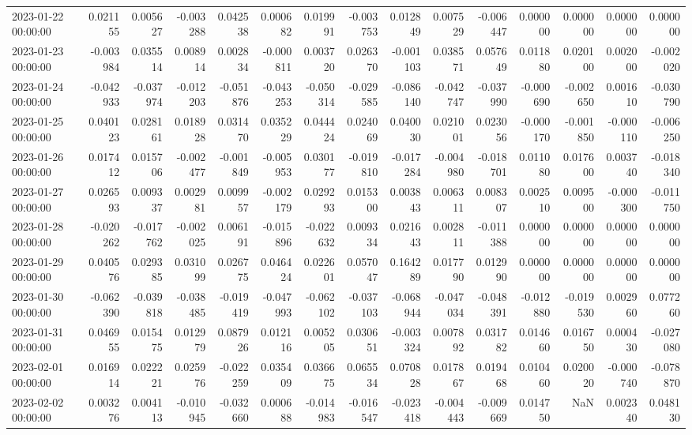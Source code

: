 \begin{tabular}{lrrrrrrrrrrrrrr}
2023-01-22 00:00:00 & 0.021155 & 0.005627 & -0.003288 & 0.042538 & 0.000682 & 0.019991 & -0.003753 & 0.012849 & 0.007529 & -0.006447 & 0.000000 & 0.000000 & 0.000000 & 0.000000 \\
2023-01-23 00:00:00 & -0.003984 & 0.035514 & 0.008914 & 0.002834 & -0.000811 & 0.003720 & 0.026370 & -0.001103 & 0.038571 & 0.057649 & 0.011880 & 0.020100 & 0.002000 & -0.002020 \\
2023-01-24 00:00:00 & -0.042933 & -0.037974 & -0.012203 & -0.051876 & -0.043253 & -0.050314 & -0.029585 & -0.086140 & -0.042747 & -0.037990 & -0.000690 & -0.002650 & 0.001610 & -0.030790 \\
2023-01-25 00:00:00 & 0.040123 & 0.028161 & 0.018928 & 0.031470 & 0.035229 & 0.044424 & 0.024069 & 0.040030 & 0.021001 & 0.023056 & -0.000170 & -0.001850 & -0.000110 & -0.006250 \\
2023-01-26 00:00:00 & 0.017412 & 0.015706 & -0.002477 & -0.001849 & -0.005953 & 0.030177 & -0.019810 & -0.017284 & -0.004980 & -0.018701 & 0.011080 & 0.017600 & 0.003740 & -0.018340 \\
2023-01-27 00:00:00 & 0.026593 & 0.009337 & 0.002981 & 0.009957 & -0.002179 & 0.029293 & 0.015300 & 0.003843 & 0.006311 & 0.008307 & 0.002510 & 0.009500 & -0.000300 & -0.011750 \\
2023-01-28 00:00:00 & -0.020262 & -0.017762 & -0.002025 & 0.006191 & -0.015896 & -0.022632 & 0.009334 & 0.021643 & 0.002811 & -0.011388 & 0.000000 & 0.000000 & 0.000000 & 0.000000 \\
2023-01-29 00:00:00 & 0.040576 & 0.029385 & 0.031099 & 0.026775 & 0.046424 & 0.022601 & 0.057047 & 0.164289 & 0.017790 & 0.012990 & 0.000000 & 0.000000 & 0.000000 & 0.000000 \\
2023-01-30 00:00:00 & -0.062390 & -0.039818 & -0.038485 & -0.019419 & -0.047993 & -0.062102 & -0.037103 & -0.068944 & -0.047034 & -0.048391 & -0.012880 & -0.019530 & 0.002960 & 0.077260 \\
2023-01-31 00:00:00 & 0.046955 & 0.015475 & 0.012979 & 0.087926 & 0.012116 & 0.005205 & 0.030651 & -0.003324 & 0.007892 & 0.031782 & 0.014660 & 0.016750 & 0.000430 & -0.027080 \\
2023-02-01 00:00:00 & 0.016914 & 0.022221 & 0.025976 & -0.022259 & 0.035409 & 0.036675 & 0.065534 & 0.070828 & 0.017867 & 0.019468 & 0.010460 & 0.020020 & -0.000740 & -0.078870 \\
2023-02-02 00:00:00 & 0.003276 & 0.004113 & -0.010945 & -0.032660 & 0.000688 & -0.014983 & -0.016547 & -0.023418 & -0.004443 & -0.009669 & 0.014750 & NaN & 0.002340 & 0.048130 \\

\end{tabular}
